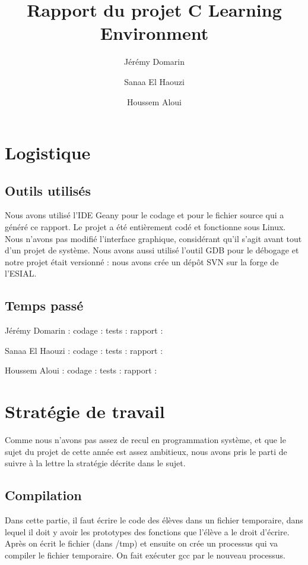 \documentclass[a4paper, 12pt]{article}
\title{Rapport du projet C Learning Environment}
\author{Jérémy Domarin \and Sanaa El Haouzi \and Houssem Aloui}
\begin{document}
\maketitle
\tableofcontents

\newpage

\section{Logistique}
\subsection{Outils utilisés}
Nous avons utilisé l'IDE Geany pour le codage et pour le fichier source qui a généré ce rapport. Le projet a été entièrement codé et fonctionne sous Linux. Nous n'avons pas modifié l'interface graphique, considérant qu'il s'agit avant tout d'un projet de système. 
Nous avons aussi utilisé l'outil GDB pour le débogage et notre projet était versionné : nous avons crée un dépôt SVN sur la forge de l'ESIAL.
\subsection{Temps passé}
Jérémy Domarin : \newline
\tabularnewline codage : \newline
\tabularnewline tests : \newline
\tabularnewline rapport : \newline
 
Sanaa El Haouzi : \newline
\tabularnewline codage : \newline
\tabularnewline tests : \newline
\tabularnewline rapport : \newline

Houssem Aloui : \newline
\tabularnewline codage : \newline 
\tabularnewline tests : \newline
\tabularnewline rapport : \newline
\section{Stratégie de travail}
Comme nous n'avons pas assez de recul en programmation système, et que le sujet du projet de cette année est assez ambitieux, nous avons pris le parti de suivre à la lettre la stratégie décrite dans le sujet.
\subsection{Compilation}
Dans cette partie, il faut écrire le code des élèves dans un fichier temporaire, dans lequel il doit y avoir les prototypes des fonctions que l'élève a le droit d'écrire. Après on écrit le fichier (dans /tmp) et ensuite on crée un processus qui va compiler le fichier temporaire. On fait exécuter gcc par le nouveau processus.
\end{document}
